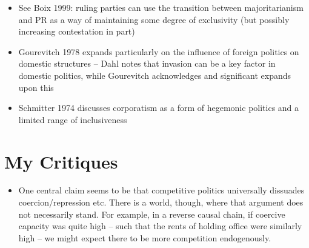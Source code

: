\documentclass[12pt]{article}
\begin{document}
\begin{itemize}
\begin{enumerate}
        \item Consistency w/ beliefs: are the new beliefs consistent with the individual's present beliefs? Tautologically, there must be some separation for this to be a meaningful shift, but are they aligned in principle or entirely separated? Do they fit into a common worldview and perhaps merely offer a differential explanation? (RG note: this could largely be tied to religious impacts on political beliefs, most notably Catholicism in modern western politics)
        \item Consistency w/ experience: are the new beliefs consistent with the policy-related (or even simply emotional) experiences the subject has endured? Do they align with previous needs/wants/solutions
    \end{enumerate}
    \item See Boix 1999: ruling parties can use the transition between majoritarianism and PR as a way of maintaining some degree of exclusivity (but possibly increasing contestation in part)
    \item Gourevitch 1978 expands particularly on the influence of foreign politics on domestic structures -- Dahl notes that invasion can be a key factor in domestic politics, while Gourevitch acknowledges and significant expands upon this
    \item Schmitter 1974 discusses corporatism as a form of hegemonic politics and a limited range of inclusiveness
\end{itemize}


\section{My Critiques}

\begin{itemize}
    \item One central claim seems to be that competitive politics universally dissuades coercion/repression etc. There is a world, though, where that argument does not necessarily stand. For example, in a reverse causal chain, if coercive capacity was quite high -- such that the rents of holding office were similarly high -- we might expect there to be more competition endogenously.
\end{itemize}
\end{document}
